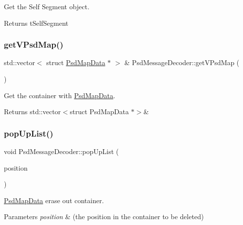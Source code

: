 Get the Self Segment object. 

\begin{DoxyReturn}{Returns}
t\+Self\+Segment 
\end{DoxyReturn}
\mbox{\label{class_psd_message_decoder_a9ab6fa68448dff44ad93bcb37a2a9690}} 
\subsubsection{\texorpdfstring{get\+V\+Psd\+Map()}{getVPsdMap()}}
{\footnotesize\ttfamily std\+::vector$<$ struct \hyperlink{struct_psd_map_data}{Psd\+Map\+Data} $\ast$ $>$ \& Psd\+Message\+Decoder\+::get\+V\+Psd\+Map (\begin{DoxyParamCaption}{ }\end{DoxyParamCaption})}



Get the container with \hyperlink{struct_psd_map_data}{Psd\+Map\+Data}. 

\begin{DoxyReturn}{Returns}
std\+::vector$<$struct Psd\+Map\+Data $\ast$$>$\& 
\end{DoxyReturn}
\mbox{\label{class_psd_message_decoder_a3f782b96f0fb6f05cd2178c626d7058b}} 
\subsubsection{\texorpdfstring{pop\+Up\+List()}{popUpList()}}
{\footnotesize\ttfamily void Psd\+Message\+Decoder\+::pop\+Up\+List (\begin{DoxyParamCaption}\item[{std\+::vector$<$ struct \hyperlink{struct_psd_map_data}{Psd\+Map\+Data} $\ast$$>$\+::iterator}]{position }\end{DoxyParamCaption})}



\hyperlink{struct_psd_map_data}{Psd\+Map\+Data} erase out container. 


\begin{DoxyParams}{Parameters}
{\em position} & (the position in the container to be deleted) \\
\hline
\end{DoxyParams}
\mbox{\label{class_psd_message_decoder_a8fbd5e60c5807f9879de028f4593bbc4}} 
